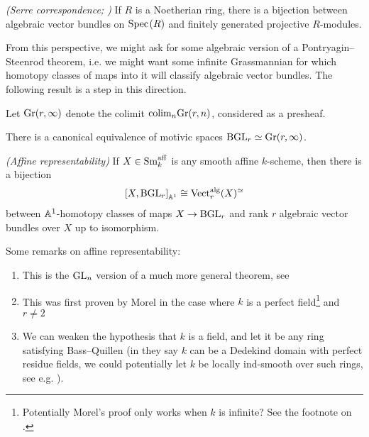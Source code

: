\documentclass[11pt,openany]{book}
\providecommand{\aff}{\mathrm{aff}}
\begin{document}
\begin{theorem} \textit{(Serre correspondence; \cite[II\S4]{FAC})} If $R$ is a Noetherian ring, there is a bijection between algebraic vector bundles on $\text{Spec}\hspace{0.1em}(R)$ and finitely generated projective $R$-modules.
\end{theorem}

From this perspective, we might ask for some algebraic version of a Pontryagin--Steenrod theorem, i.e. we might want some infinite Grassmannian for which homotopy classes of maps into it will classify algebraic vector bundles. The following result is a step in this direction.

\begin{definition} Let $\mathrm{Gr}(r,\infty)$ denote the colimit $\mathrm{colim}_n \mathrm{Gr}(r,n)$, considered as a presheaf.
\end{definition}

\begin{proposition} \cite[p.138]{MV}
There is a canonical equivalence of motivic spaces $\mathrm{BGL}_r \simeq \mathrm{Gr}(r,\infty)$.
\end{proposition}

\begin{theorem} \textit{(Affine representability)} \cite{AHW1} If $X \in \Sm_k^\aff$ is any smooth affine $k$-scheme, then there is a bijection
\begin{align*}
    \left[ X, \mathrm{BGL}_r \right]_{\mathbb{A}^1} \cong \mathrm{Vect}_r^{\mathrm{alg}}(X)^{\simeq}
\end{align*}
between $\mathbb{A}^1$-homotopy classes of maps $X \to \mathrm{BGL}_r$ and rank $r$ algebraic vector bundles over $X$ up to isomorphism.
\end{theorem}

\begin{remark} Some remarks on affine representability:
\begin{enumerate}
    \item This is the $\mathrm{GL}_n$ version of a much more general theorem, see \cite{AHW1,AHW2,AHW3}
    \item This was first proven by Morel in the case where $k$ is a perfect field\footnote{Potentially Morel's proof only works when $k$ is infinite? See the footnote on \cite[p.~1925]{AHW1}.} and $r\ne 2$ \cite[8.1(3)]{Morel}
    \item We can weaken the hypothesis that $k$ is a field, and let it be any ring satisfying Bass--Quillen (in \cite{AHW1} they say $k$ can be a Dedekind domain with perfect residue fields, we could potentially let $k$ be locally ind-smooth over such rings, see e.g. \cite[4.2.12]{AHW2}).
\end{enumerate}

\end{remark}
\end{document}
